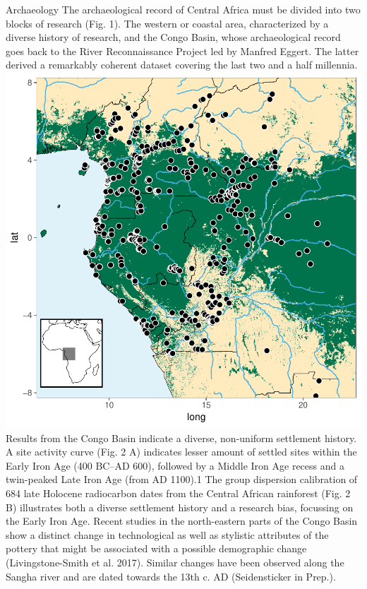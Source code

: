 \documentclass[a0]{sciposter}
\begin{document}
{\begin{minipage}[t][102cm][t]{82cm}
\begin{minipage}[t]{77cm}
\begin{multicols}{3}
{\fontsize{38}{42} \selectfont \textcolor{HeadCol}{Archaeology}}
\bigbreak
{\fontsize{28}{36} \selectfont The archaeological record of Central Africa must be divided into two blocks of research (Fig. 1). The western or coastal area, characterized by a diverse history of research, and the Congo Basin, whose archaeological record goes back to the River Reconnaissance Project led by Manfred Eggert. The latter derived a remarkably coherent dataset covering the last two and a half millennia.}
\bigbreak
\includegraphics[width = \linewidth]{img/FigArch.pdf}
\bigbreak
{\fontsize{28}{36} \selectfont Results from the Congo Basin indicate a diverse, non-uniform settlement history. A site activity curve (Fig. 2 A) indicates lesser amount of settled sites within the Early Iron Age (400 BC–AD 600), followed by a Middle Iron Age recess and a twin-peaked Late Iron Age (from AD 1100).1 The group dispersion calibration of 684 late Holocene radiocarbon dates from the Central African rainforest (Fig. 2 B) illustrates both a diverse settlement history and a research bias, focussing on the Early Iron Age.}
\bigbreak
{\fontsize{28}{36} \selectfont Recent studies in the north-eastern parts of the Congo Basin show a distinct change in technological as well as stylistic attributes of the pottery that might be associated with a possible demographic change (Livingstone-Smith et al. 2017). Similar changes have been observed along the Sangha river and are dated towards the 13th c. AD (Seidensticker in Prep.).}

\end{multicols}
\end{minipage}
\end{minipage}}
\end{document}
